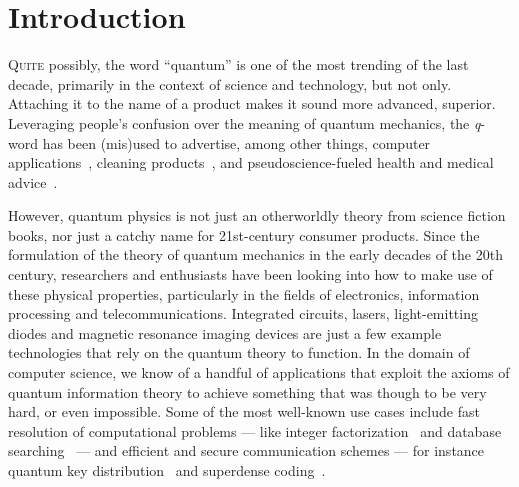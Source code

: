 \chapter{Introduction}
\label{chp:intro}

\lettrine{Q}{uite} possibly, the word ``quantum'' is one of the most trending of the last decade,
primarily in the context of science and technology, but not only. Attaching it to the name of a
product makes it sound more advanced, superior. Leveraging people's confusion over the meaning of
quantum mechanics, the \emph{q}-word has been (mis)used to advertise, among other things, computer
applications~\cite{firefox_quantum}, cleaning products~\cite{finish_quantum}, and
pseudoscience-fueled health and medical advice~\cite{milgrom_2002_patient}.

However, quantum physics is not just an otherworldly theory from science fiction books, nor just a
catchy name for 21st-century consumer products. Since the formulation of the theory of quantum
mechanics in the early decades of the 20th century, researchers and enthusiasts have been looking
into how to make use of these physical properties, particularly in the fields of electronics,
information processing and telecommunications. Integrated circuits, lasers, light-emitting diodes
and magnetic resonance imaging devices are just a few example technologies that rely on the quantum
theory to function. In the domain of computer science, we know of a handful of applications that
exploit the axioms of quantum information theory to achieve something that was though to be very
hard, or even impossible. Some of the most well-known use cases include fast resolution of
computational problems --- like integer factorization~\cite{shor_1994_algorithms} and database
searching~\cite{grover_1996_search} --- and efficient and secure communication schemes --- for
instance quantum key distribution~\cite{bennett_2014_bb84, ekert_1991_e91} and superdense
coding~\cite{bennett_1992_communication}.


